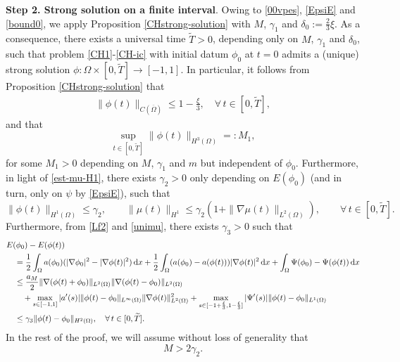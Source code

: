 \documentclass[11pt,reqno]{amsart}
\theoremstyle{remark}
\def\d{{\rm d}}
\def\E{\mathcal{E}}
\numberwithin{equation}{section}
\def\d{{\rm d}}
\newcommand{\vp}{\phi}
\begin{document}
\medskip
\textbf{Step 2. Strong solution on a finite interval}.
Owing to \eqref{00vpes}, \eqref{EpsiE} and \eqref{bound0}, we apply Proposition
\ref{CHstrong-solution} with $M$, $\gamma_1$ and $\delta_0:=\frac23\xi$.  As a consequence, there exists a universal time $\widetilde{T}>0$, depending only on $M$, $\gamma_1$ and $\delta_0$, such that problem
\eqref{CH1}-\eqref{CH-ic} with initial datum $\phi_0$ at $t=0$ admits a (unique) strong solution
$\vp: \Omega \times [0,\widetilde{T}] \to [-1,1]$. In particular, it follows from Proposition
\ref{CHstrong-solution} that
\begin{align}
\|\vp(t)\|_{C(\overline{\Omega})}\leq 1-\frac{\xi}{3},\quad \forall\, t\in[0,\widetilde{T}],\label{Lf2}
\end{align}
and that
\begin{equation}
\label{fiH33}
\sup_{t\in [0,\widetilde{T}]}\|\phi(t)\|_{H^3(\Omega)}=: M_1,
\end{equation}
for some $M_1>0$ depending on $M$, $\gamma_1$ and $m$ but independent of $\phi_0$.
Furthermore, in light of \eqref{est-mu-H1}, there exists $\gamma_2>0$ only depending on $E(\phi_0)$ (and in turn, only on $\psi$ by \eqref{EpsiE}), such that
\begin{equation}
\label{unimu}
\|\phi(t)\|_{H^1(\Omega)}\leq \gamma_2,\qquad
\|\mu(t)\|_{H^1}\leq \gamma_2(1+\|\nabla \mu(t)\|_{L^2(\Omega)}),\qquad \forall \, t\in [0,\widetilde{T}].
\end{equation}
Furthermore, from \eqref{Lf2} and \eqref{unimu}, there exists $\gamma_3>0$ such that
\begin{align}
&E(\vp_0)-E(\vp(t)) \notag
\\
&\quad =\frac12\int_\Omega a(\vp_0)(|\nabla \vp_0|^2-|\nabla\vp(t)|^2)\,\d x+\frac12\int_\Omega (a(\vp_0)-a(\vp(t)))|\nabla\vp(t)|^2\,\d x
+\int_\Omega \Psi(\vp_0)-\Psi(\vp(t))\, \d x
\notag \\
&\quad \leq \frac{a_M}{2}\|\nabla (\vp(t)+\vp_0)\|_{L^2(\Omega)}
\|\nabla (\vp(t)-\vp_0)\|_{L^2(\Omega)}
\notag\\
&
\qquad+\max_{s\in [-1,1]}|a'(s)|\|\vp(t)-\vp_0\|_{L^\infty(\Omega)}\|\nabla\vp(t)\|_{L^2(\Omega)}^2
+ \max_{s\in[-1+\frac{\xi}{3},1-\frac{\xi}{3}]}|\Psi'(s)|
  \|\vp(t)-\vp_0\|_{L^1(\Omega)}
  \notag
  \\
& \quad \leq \gamma_3\|\vp(t)-\vp_0\|_{H^2(\Omega)}, \quad \forall\, t\in [0,\widetilde{T}].\label{edd}
\end{align}
In the rest of the proof, we will assume without loss of generality that
\begin{equation}
\label{Mgrande}
M>2\gamma_2.
\end{equation}
\end{document}

